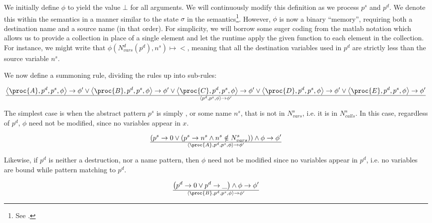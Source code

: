 We initially define $\phi$ to yield the value $\bot$ for all arguments. We will
continuously modify this definition as we process $p^s$ and $p^d$. We denote
this within the semantics in a manner similar to the state $\sigma$ in the
semantics\footnote{See .}. However, $\phi$ is now a
binary ``memory'', requiring both a destination name and a source name (in that
order). For simplicity, we will borrow some suger coding from the matlab
notation which allows us to provide a collection in place of a single element
and let the runtime apply the given function to each element in the collection.
For instance, we might write that $\phi\left(N_{vars}^d(p^d), n^s\right)\mapsto
<$, meaning that all the destination variables used in $p^d$ are strictly less
than the source variable $n^s$.

We now define a summoning rule, dividing the rules up into sub-rules:

\begin{equation}
{
    \left\langle\proc{A},p^d,p^s,\phi\right\rangle
    \rightarrow
    \phi'
  \vee
    \left\langle\proc{B},p^d,p^s,\phi\right\rangle
    \rightarrow
    \phi'
  \vee
    \left\langle\proc{C},p^d,p^s,\phi\right\rangle
    \rightarrow
    \phi'
  \vee
    \left\langle\proc{D},p^d,p^s,\phi\right\rangle
    \rightarrow
    \phi'
  \vee
    \left\langle\proc{E},p^d,p^s,\phi\right\rangle
    \rightarrow
    \phi'
}\over{
  \left\langle p^d,p^s,\phi\right\rangle
  \rightarrow
  \phi'
}
\end{equation}

The simplest case is when the abstract pattern $p^s$ is simply , or
some name $n^s$, that is not in $N_{vars}^s$, i.e. it is in $N_{calls}^s$. In
this case, regardless of $p^d$, $\phi$ need not be modified, since no variables
appear in $x$.

\begin{equation}\label{eq:sct-pattern-source-fail}
{
\left(
    p^s\rightarrow 0
  \vee
\left(
    p^s\rightarrow n^s
  \wedge
    n^s\notin N_{vars}^s
\right)
\right)
  \wedge
    \phi\rightarrow\phi'
}\over{
  \left\langle\proc{A},p^d,p^s,\phi\right\rangle
  \rightarrow
  \phi'
}
\end{equation}

Likewise, if $p^d$ is neither a destruction, nor a name pattern, then $\phi$
need not be modified since no variables appear in $p^d$, i.e. no variables are
bound while pattern matching to $p^d$.

\begin{equation}
{
\left(
    p^d\rightarrow 0
\vee
    p^d\rightarrow \_
\right)
  \wedge
    \phi\rightarrow\phi'
}\over{
  \left\langle\proc{B},p^d,p^s,\phi\right\rangle
  \rightarrow
  \phi'
}
\end{equation}

